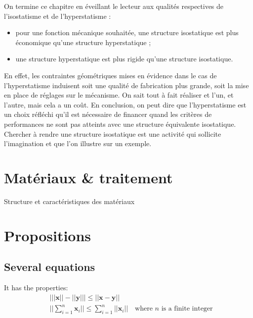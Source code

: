 \documentclass[
	11pt, %
	fleqn, %
	a4paper, %
]{LegrandOrangeBook}
\begin{document}
\begin{remark}
    On termine ce chapitre en éveillant le lecteur aux qualités respectives de l’isostatisme et de l’hyperstatisme :
\begin{itemize}
    \item pour une fonction mécanique souhaitée, une structure isostatique est plus économique qu'une structure hyperstatique ;
    \item une structure hyperstatique est plus rigide qu’une structure isostatique.
\end{itemize}

En effet, les contraintes géométriques mises en évidence dans le cas de l’hyperstatisme induisent soit une qualité de fabrication plus grande, soit la mise en place de réglages sur le mécanisme. On sait tout à fait réaliser et l’un, et l’autre, mais cela a un coût. En conclusion, on peut dire que l’hyperstatisme est un choix réfléchi qu’il est nécessaire de financer quand les critères de performances ne sont pas atteints avec une structure équivalente isostatique.
Chercher à rendre une structure isostatique est une activité qui sollicite l’imagination et que l’on illustre sur un exemple.
\end{remark}


\section{Matériaux \& traitement}
\begin{corollary}[S4.1]
Structure et caractéristiques des matériaux
\end{corollary}


\section{Propositions}

\subsection{Several equations}

\begin{proposition}[Proposition name] %
	It has the properties:
	\begin{align}
		& \big| ||\mathbf{x}|| - ||\mathbf{y}|| \big|\leq || \mathbf{x}- \mathbf{y}||\\
		&  ||\sum_{i=1}^n\mathbf{x}_i||\leq \sum_{i=1}^n||\mathbf{x}_i||\quad\text{where $n$ is a finite integer}
	\end{align}
\end{proposition}
\end{document}
